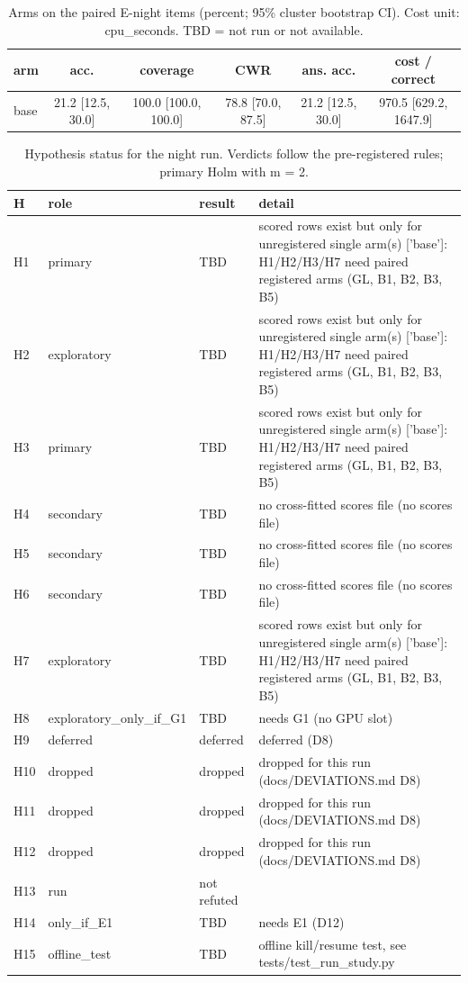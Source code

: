 \begin{table}[t]\centering\small
\caption{Arms on the paired E-night items (percent; 95\% cluster bootstrap CI). Cost unit: cpu\_seconds. TBD = not run or not available.}
\begin{tabular}{lccccc}\toprule
arm & acc. & coverage & CWR & ans. acc. & cost / correct \\\midrule
base & 21.2 [12.5, 30.0] & 100.0 [100.0, 100.0] & 78.8 [70.0, 87.5] & 21.2 [12.5, 30.0] & 970.5 [629.2, 1647.9] \\
\bottomrule\end{tabular}\end{table}

\begin{table}[t]\centering\small
\caption{Hypothesis status for the night run. Verdicts follow the pre-registered rules; primary Holm with m = 2.}
\begin{tabular}{lll p{6.2cm}}\toprule
H & role & result & detail \\\midrule
H1 & primary & TBD & scored rows exist but only for unregistered single arm(s) ['base']: H1/H2/H3/H7 need paired registered arms (GL, B1, B2, B3, B5) \\
H2 & exploratory & TBD & scored rows exist but only for unregistered single arm(s) ['base']: H1/H2/H3/H7 need paired registered arms (GL, B1, B2, B3, B5) \\
H3 & primary & TBD & scored rows exist but only for unregistered single arm(s) ['base']: H1/H2/H3/H7 need paired registered arms (GL, B1, B2, B3, B5) \\
H4 & secondary & TBD & no cross-fitted scores file (no scores file) \\
H5 & secondary & TBD & no cross-fitted scores file (no scores file) \\
H6 & secondary & TBD & no cross-fitted scores file (no scores file) \\
H7 & exploratory & TBD & scored rows exist but only for unregistered single arm(s) ['base']: H1/H2/H3/H7 need paired registered arms (GL, B1, B2, B3, B5) \\
H8 & exploratory\_only\_if\_G1 & TBD & needs G1 (no GPU slot) \\
H9 & deferred & deferred & deferred (D8) \\
H10 & dropped & dropped & dropped for this run (docs/DEVIATIONS.md D8) \\
H11 & dropped & dropped & dropped for this run (docs/DEVIATIONS.md D8) \\
H12 & dropped & dropped & dropped for this run (docs/DEVIATIONS.md D8) \\
H13 & run & not refuted &  \\
H14 & only\_if\_E1 & TBD & needs E1 (D12) \\
H15 & offline\_test & TBD & offline kill/resume test, see tests/test\_run\_study.py \\
\bottomrule\end{tabular}\end{table}
